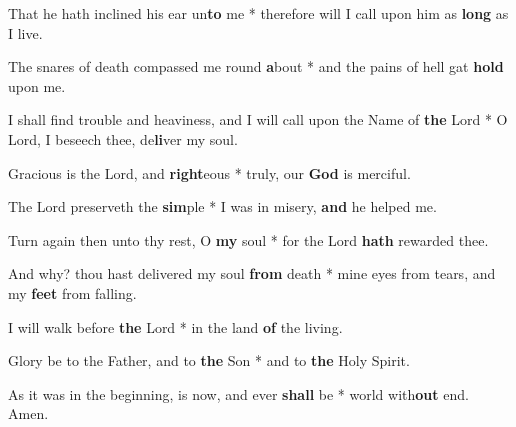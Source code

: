 \begin{multicols}{2}
	That he hath inclined his ear un\textbf{to} me * therefore will I call upon him as \textbf{long} as I live.
	
	The snares of death compassed me round \textbf{a}bout * and the pains of hell gat \textbf{hold} upon me.
	
	I shall find trouble and heaviness, and I will call upon the Name of \textbf{the} Lord * O Lord, I beseech thee, de\textbf{li}ver my soul.
	
	Gracious is the Lord, and \textbf{right}eous * truly, our \textbf{God} is merciful.
	
	The Lord preserveth the \textbf{sim}ple * I was in misery, \textbf{and} he helped me.
	
	Turn again then unto thy rest, O \textbf{my} soul * for the Lord \textbf{hath} rewarded thee.
	
	And why? thou hast delivered my soul \textbf{from} death * mine eyes from tears, and my \textbf{feet} from falling.
	
	I will walk before \textbf{the} Lord * in the land \textbf{of} the living.
	
	Glory be to the Father, and to \textbf{the} Son * and to \textbf{the} Holy Spirit.
	
	As it was in the beginning, is now, and ever \textbf{shall} be * world with\textbf{out} end. Amen.
\end{multicols}
